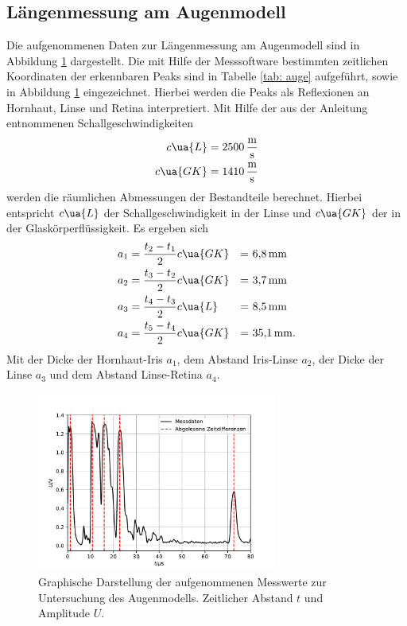 \subsection{Längenmessung am Augenmodell}
Die aufgenommenen Daten zur Längenmessung am Augenmodell sind in Abbildung \ref{fig: auge} dargestellt. Die mit Hilfe
der Messsoftware bestimmten zeitlichen Koordinaten der erkennbaren Peaks sind in Tabelle \ref{tab: auge} aufgeführt, sowie in Abbildung
\ref{fig: auge} eingezeichnet. Hierbei werden die Peaks als Reflexionen an Hornhaut, Linse und Retina interpretiert.
Mit Hilfe der aus der Anleitung \cite{} entnommenen Schallgeschwindigkeiten
\begin{align}
  \begin{aligned}
    c\ua{L} &= \SI{2500}{\meter\per\second}\\
    c\ua{GK}&= \SI{1410}{\meter\per\second}
  \end{aligned}
\end{align}
werden die räumlichen Abmessungen der Bestandteile berechnet. Hierbei entspricht $c\ua{L}$ der Schallgeschwindigkeit
in der Linse und $c\ua{GK}$ der in der Glaskörperflüssigkeit. Es ergeben sich
\begin{align}
  \begin{aligned}
a_1 &= \frac{t_2 - t_1}{2} c\ua{GK} &=&\,\, \SI[]{6.8}{\milli\meter} \\
a_2 &= \frac{t_3 - t_2}{2} c\ua{GK} &=&\,\, \SI[]{3.7}{\milli\meter}\\
a_3 &= \frac{t_4 - t_3}{2} c\ua{L}  &=&\,\, \SI[]{8.5}{\milli\meter}\\
a_4 &= \frac{t_5 - t_4}{2} c\ua{GK} &=&\,\,\SI[]{35.1}{\milli\meter}.
\end{aligned}
\end{align}
Mit der Dicke der Hornhaut-Iris $a_1$, dem Abstand Iris-Linse $a_2$,
der Dicke der Linse $a_3$ und dem Abstand Linse-Retina $a_4$.

\begin{figure}[H]
  \centering
  \includegraphics[width = 0.7\textwidth]{../Messdaten/plots/auge.pdf}
  \caption{Graphische Darstellung der aufgenommenen Messwerte zur Untersuchung des Augenmodells. Zeitlicher Abstand $t$ und Amplitude $U$.}
  \label{fig: auge}
\end{figure}
